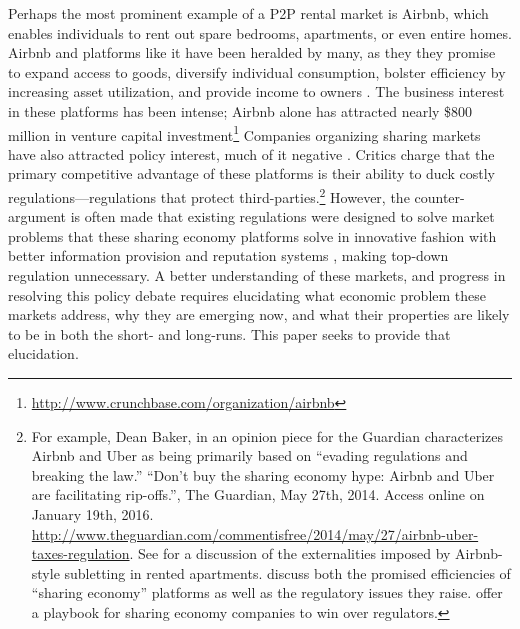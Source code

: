 \documentclass[11pt]{article}
\begin{document}
Perhaps the most prominent example of a P2P rental market is Airbnb, which enables individuals to rent out spare bedrooms, apartments, or even entire homes. 
Airbnb and platforms like it have been heralded by many, as they they promise to expand access to goods, diversify individual consumption, bolster efficiency by increasing asset utilization, and provide income to owners \citep{sundararajan2013zipcar, edelman2015efficiencies, botsman2010s}.
The business interest in these platforms has been intense; Airbnb alone has attracted nearly \$800 million in venture capital investment\footnote{\href{http://www.crunchbase.com/organization/airbnb}{http://www.crunchbase.com/organization/airbnb}}
Companies organizing sharing markets have also attracted policy interest, much of it negative \citep{slee2015, malhotra2014dark, avital2015sharing}. 
Critics charge that the primary competitive advantage of these platforms is their ability to duck costly regulations---regulations that protect third-parties.\footnote{
  For example, Dean Baker, in an opinion piece for the Guardian characterizes Airbnb and Uber as being primarily based on ``evading regulations and breaking the law.''
  ``Don't buy the sharing economy hype: Airbnb and Uber are facilitating rip-offs.'', The Guardian, May 27th, 2014. Access online on January 19th, 2016.
  \url{http://www.theguardian.com/commentisfree/2014/may/27/airbnb-uber-taxes-regulation}. 
  See \cite{horton2014tragedy} for a discussion of the externalities imposed by Airbnb-style subletting in rented apartments.
  \cite{edelman2015efficiencies} discuss both the promised efficiencies of ``sharing economy'' platforms as well as the regulatory issues they raise.
  \cite{cannon2014uber} offer a playbook for sharing economy companies to win over regulators.
}   
However, the counter-argument is often made that existing regulations were designed to solve market problems that these sharing economy platforms solve in innovative fashion with better information provision and reputation systems \citep{koopman2014sharing}, making top-down regulation unnecessary.  
A better understanding of these markets, and progress in resolving this policy debate requires elucidating what economic problem these markets address, why they are emerging now, and what their properties are likely to be in both the short- and long-runs. 
This paper seeks to provide that elucidation. 
\end{document}
